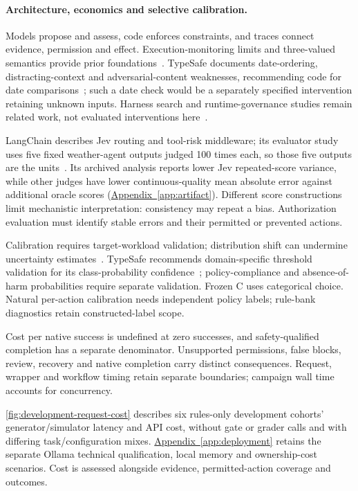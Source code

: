 \paragraph{Architecture, economics and selective calibration.}
Models propose and assess, code enforces constraints, and traces connect evidence,
permission and effect. Execution-monitoring limits and three-valued semantics
provide prior foundations~\citep{schneider2000enforceable,bauer2011runtime}.
TypeSafe documents date-ordering, distracting-context and adversarial-content
weaknesses, recommending code for date comparisons~\citep{typesafe2026jevdocs};
such a date check would be a separately specified intervention retaining unknown
inputs. Harness search and runtime-governance studies remain related work,
not evaluated interventions here~\citep{liu2026solpi,shlomov2026governance}.

LangChain describes Jev routing and tool-risk middleware; its evaluator study
uses five fixed weather-agent outputs judged 100 times each, so those five
outputs are the units~\citep{runkle2026harness,shea2026jevjudge}. Its archived
analysis reports lower Jev repeated-score variance, while other judges have
lower continuous-quality mean absolute error against additional oracle scores
(\hyperref[app:artifact]{Appendix~\ref*{app:artifact}}). Different score
constructions limit mechanistic interpretation: consistency may repeat a bias.
Authorization evaluation must identify stable errors and their permitted or
prevented actions.

Calibration requires target-workload validation; distribution shift can
undermine uncertainty estimates~\citep{guo2017calibration,ovadia2019uncertainty}.
TypeSafe recommends domain-specific threshold validation for its
class-probability confidence~\citep{typesafe2026jevdocs}; policy-compliance and absence-of-harm
probabilities require separate validation. Frozen C uses categorical choice.
Natural per-action calibration needs independent policy labels; rule-bank
diagnostics retain constructed-label scope.

Cost per native success is undefined at zero successes, and safety-qualified completion has
a separate denominator. Unsupported permissions, false blocks, review,
recovery and native completion carry distinct consequences. Request, wrapper
and workflow timing retain separate boundaries; campaign wall time accounts
for concurrency.

\autoref{fig:development-request-cost} describes six rules-only development
cohorts' generator/simulator latency and API cost, without gate or grader
calls and with differing task/configuration mixes.
\hyperref[app:deployment]{Appendix~\ref*{app:deployment}} retains the separate
Ollama technical qualification, local memory and ownership-cost scenarios.
Cost is assessed alongside evidence, permitted-action coverage and outcomes.
